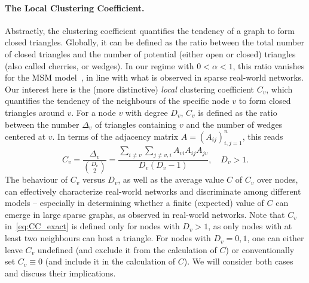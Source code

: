 \documentclass[ twocolumn,
 amsmath,amssymb,
 aps, pre, amsthm, amsfonts,
]{revtex4-2}
\begin{document}
\paragraph*{The Local Clustering Coefficient.}
Abstractly, the clustering coefficient quantifies the tendency of a graph to form closed triangles. Globally, it can be defined as the ratio between the total number of closed triangles and the number of potential  (either open or closed) triangles (also called cherries, or wedges). In our regime with $0<\alpha<1$, this ratio vanishes for the MSM model~\cite{avena2022inhomogeneous}, in line with what is observed in sparse real-world networks. 
Our interest here is the (more distinctive) {\em local} clustering coefficient $C_v$, which quantifies the tendency of the neighbours of the specific node $v$ to form closed triangles around $v$.
For a node $v$ with degree $D_v$, $C_v$ is defined as the ratio between the number $\Delta_v$ of triangles containing $v$ and the number of wedges centered at $v$. In terms of the adjacency matrix $A=(A_{ij})_{i,j=1}^n$, this reads 
\begin{equation}
    C_v = \frac{\Delta_v}{\binom{D_v}{2}} = \frac{\sum_{i\ne v}\sum_{j\ne v,i} A_{vi}A_{ij}A_{jv}}{D_v (D_v - 1)},\quad D_v > 1.\label{eq:CC_exact}
\end{equation}
The behaviour of $C_v$ versus $D_v$, as well as the average value $C$ of $C_v$ over nodes, can effectively characterize real-world networks and discriminate among different models -- especially in determining whether a finite (expected) value of $C$ can emerge in large sparse graphs, as observed in real-world networks. 
Note that $C_v$ in~\eqref{eq:CC_exact} is defined only for nodes with $D_v > 1$, as only nodes with at least two neighbours can host a triangle. 
For nodes with $D_v = 0, 1$, one can either leave $C_v$ undefined (and exclude it from the calculation of $C$) or conventionally set $C_v\equiv 0$ (and include it in the calculation of $C$). We will consider both cases and discuss their implications.
\end{document}
